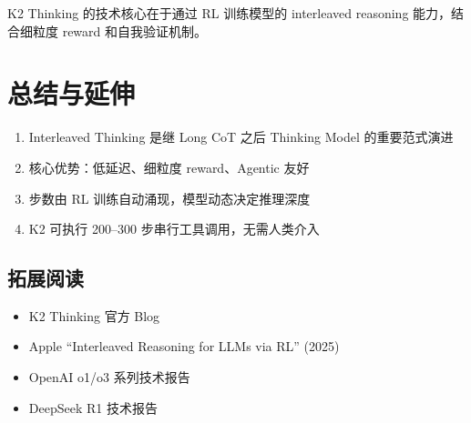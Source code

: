 \documentclass[a4paper]{article}
\begin{document}
K2 Thinking 的技术核心在于通过 RL 训练模型的 interleaved reasoning 能力，结合细粒度 reward 和自我验证机制。

\section{总结与延伸}

\begin{enumerate}
  \item Interleaved Thinking 是继 Long CoT 之后 Thinking Model 的重要范式演进
  \item 核心优势：低延迟、细粒度 reward、Agentic 友好
  \item 步数由 RL 训练自动涌现，模型动态决定推理深度
  \item K2 可执行 200--300 步串行工具调用，无需人类介入
\end{enumerate}

\subsection{拓展阅读}

\begin{itemize}
  \item K2 Thinking 官方 Blog
  \item Apple ``Interleaved Reasoning for LLMs via RL'' (2025)
  \item OpenAI o1/o3 系列技术报告
  \item DeepSeek R1 技术报告
\end{itemize}
\end{document}
